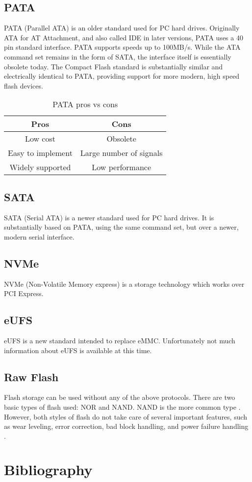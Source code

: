 \documentclass[12pt,article]{memoir}
\begin{document}
\section{PATA}
PATA (Parallel ATA) is an older standard used for PC hard drives. Originally ATA for AT Attachment, and also called IDE in later versions, PATA uses a 40 pin standard interface. PATA supports speeds up to 100MB/s. While the ATA command set remains in the form of SATA, the interface itself is essentially obsolete today. \cite{wiki:pata} The Compact Flash standard is substantially similar and electrically identical to PATA, providing support for more modern, high speed flash devices. \cite{wiki:compactflash} 
\begin{table}[H]
	\centering
	\begin{tabu}{c | c}
		Pros & Cons \\ \hline
		Low cost & Obsolete\\
		Easy to implement & Large number of signals\\
		Widely supported & Low performance
	\end{tabu}
	\caption{PATA pros vs cons}
\end{table}

\section{SATA}
SATA (Serial ATA) is a newer standard used for PC hard drives. It is substantially based on PATA, using the same command set, but over a newer, modern serial interface. \cite{wiki:sata}

\section{NVMe}
NVMe (Non-Volatile Memory express) is a storage technology which works over PCI Express.

\section{eUFS}
eUFS is a new standard intended to replace eMMC. Unfortunately not much information about eUFS is available at this time.

\section{Raw Flash}
Flash storage can be used without any of the above protocols. There are two basic types of flash used: NOR and NAND. NAND is the more common type \cite{toradex:flash}. However, both styles of flash do not take care of several important features, such as wear leveling, error correction, bad block handling, and power failure handling \cite{toradex:flash}.
\newpage

\chapter{Bibliography}
\printbibliography[heading=none]

\end{document}
